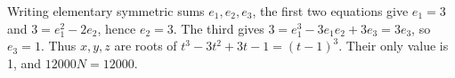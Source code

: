 Writing elementary symmetric sums $e_1,e_2,e_3$, the first two equations give $e_1=3$ and $3=e_1^2-2e_2$, hence $e_2=3$. The third gives $3=e_1^3-3e_1e_2+3e_3=3e_3$, so $e_3=1$. Thus $x,y,z$ are roots of $t^3-3t^2+3t-1=(t-1)^3$. Their only value is 1, and $\boxed{12000N=12000}$.
